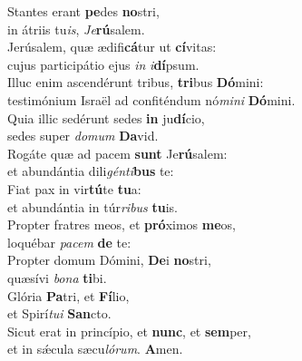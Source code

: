 \evenverse Stantes erant \textbf{pe}des \textbf{no}stri,~\*\\
\evenverse in átriis tu\textit{is}, \textit{Je}\textbf{rú}salem.\\
\oddverse Jerúsalem, quæ ædifi\textbf{cá}tur ut \textbf{cí}vitas:~\*\\
\oddverse cujus participátio ejus \textit{in} \textit{i}\textbf{dí}psum.\\
\evenverse Illuc enim ascendérunt tribus, \textbf{tri}bus \textbf{Dó}mini:~\*\\
\evenverse testimónium Israël ad confiténdum nó\textit{mi}\textit{ni} \textbf{Dó}mini.\\
\oddverse Quia illic sedérunt sedes \textbf{in} ju\textbf{dí}cio,~\*\\
\oddverse sedes super \textit{do}\textit{mum} \textbf{Da}vid.\\
\evenverse Rogáte quæ ad pacem \textbf{sunt} Je\textbf{rú}salem:~\*\\
\evenverse et abundántia dili\textit{gén}\textit{ti}\textbf{bus} te:\\
\oddverse Fiat pax in vir\textbf{tú}te \textbf{tu}a:~\*\\
\oddverse et abundántia in túr\textit{ri}\textit{bus} \textbf{tu}is.\\
\evenverse Propter fratres meos, et \textbf{pró}ximos \textbf{me}os,~\*\\
\evenverse loquébar \textit{pa}\textit{cem} \textbf{de} te:\\
\oddverse Propter domum Dómini, \textbf{De}i \textbf{no}stri,~\*\\
\oddverse quæsívi \textit{bo}\textit{na} \textbf{ti}bi.\\
\evenverse Glória \textbf{Pa}tri, et \textbf{Fí}lio,~\*\\
\evenverse et Spirí\textit{tu}\textit{i} \textbf{San}cto.\\
\oddverse Sicut erat in princípio, et \textbf{nunc}, et \textbf{sem}per,~\*\\
\oddverse et in sǽcula sæcu\textit{ló}\textit{rum}. \textbf{A}men.\\
